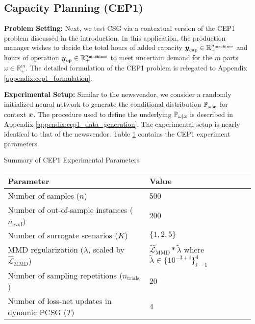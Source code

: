 \subsection{Capacity Planning (CEP1)} 
\textbf{Problem Setting:} Next, we test CSG via a contextual version of the CEP1 problem discussed in the introduction. In this application, the production manager wishes to decide the total hours of added capacity $\boldsymbol{y}_{\text{cap}} \in \mathbb{R}^{n_{\text{machines}}}_+$ and hours of operation $\boldsymbol{y}_{\text{op}} \in \mathbb{R}^{n_{\text{machines}}}_+$ to meet uncertain demand for the $m$ parts $\omega \in \mathbb{R}_+^m$. The detailed formulation of the CEP1 problem is relegated to Appendix \ref{appendix:cep1_formulation}. 

\vspace{\littlespace}
\noindent \textbf{Experimental Setup:}
Similar to the newsvendor, we consider a randomly initialized neural network to generate the conditional distribution $\mathbb{P}_{\omega | \boldsymbol{x}}$ for context $\boldsymbol{x}$. The procedure used to define the underlying $\mathbb{P}_{\omega | \boldsymbol{x}}$ is described in Appendix \ref{appendix:cep1_data_generation}. The experimental setup is nearly identical to that of the newsvendor. Table \ref{tab:CEP1_parameters} contains the CEP1 experiment parameters. 



\begin{table}[h]
    \TABLE
    {Summary of CEP1 Experimental Parameters \label{tab:CEP1_parameters}}
    {\begin{tabular}{ll}
        \toprule
        \textbf{Parameter} & \textbf{Value} \\
        \midrule
        Number of samples ($n$) & 500 \\
        Number of out-of-sample instances ($n_{\text{eval}}$) & 200 \\
        Number of surrogate scenarios ($K$) & $\{1, 2, 5\}$ \\
        MMD regularization ($\lambda$, scaled by $\mathcal{\hat{L}}_{\text{MMD}}$) & $\mathcal{\hat{L}}_{\text{MMD}} * \tilde{\lambda}$ where $\tilde{\lambda} \in \{10^{-3+i}\}_{i=1}^4$ \\
        Number of sampling repetitions ($n_{\text{trials}}$) & 20 \\
        Number of loss-net updates in dynamic PCSG ($T$) & 4 \\
        \bottomrule
        \end{tabular}}{}
    \end{table}

